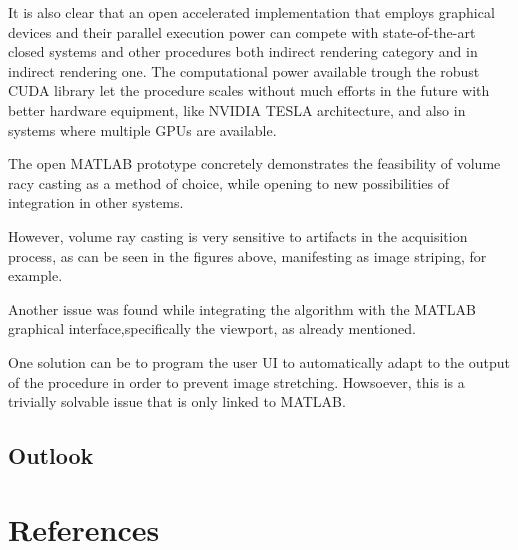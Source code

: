 \documentclass[12pt,a4paper]{extarticle}
\newcommand{\linespace}{\vspace{8pt}}
\begin{document}
It is also clear that an open accelerated implementation that employs graphical devices and their parallel execution power can compete with state-of-the-art closed systems and other procedures both indirect rendering category and in indirect rendering one.
The computational power available trough the robust CUDA library let the procedure scales without much efforts in the future with better hardware equipment, like NVIDIA TESLA architecture,  and also in systems where multiple GPUs are available. 
\linespace

The open MATLAB prototype concretely demonstrates the feasibility of volume racy casting as a method of choice, while opening to new possibilities of integration in other systems.
\linespace

However, volume ray casting is very sensitive to artifacts in the acquisition process, as can be seen in the figures above, manifesting as image striping, for example. 
\linespace

Another issue was found while integrating the algorithm with the MATLAB graphical interface,specifically the viewport, as already mentioned.

One solution can be to program the user UI to automatically adapt to the output of the procedure in order to prevent image stretching. Howsoever, this is a trivially solvable issue that is only linked to MATLAB.

\subsection{Outlook}
% 
\pagebreak
\section*{References}
\nocite{*}
\printbibliography[heading=none]{}
\end{document}

